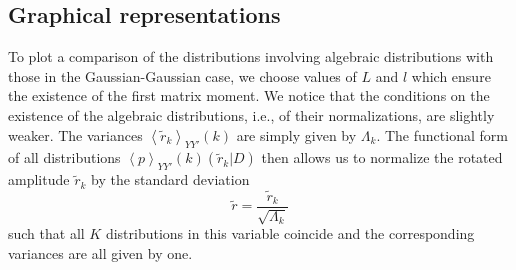 \subsection{Graphical representations}\label{subsec:graphical_distributions}

To plot a comparison of the distributions involving algebraic distributions
with those in the Gaussian-Gaussian case, we choose values of $L$ and $l$ which
ensure the existence of the first matrix moment. We notice that the conditions
on the existence of the algebraic distributions, i.e., of their normalizations,
are slightly weaker. The variances
$\left\langle \tilde{r}_{k} \right\rangle_{YY'}{\left(k\right)}$ are simply
given by $\Lambda_{k}$. The functional form of all distributions
$\left\langle p \right\rangle_{YY'}{\left(k\right)} \left(\tilde{r}_{k} \vert D \right)$
then allows us to normalize the rotated amplitude $\tilde{r}_k$ by the standard
deviation
\begin{equation}
    \tilde{r} = \frac{\tilde{r}_{k}}{\sqrt{\Lambda_{k}}}
\end{equation}
such that all $K$ distributions in this variable coincide and the corresponding
variances are all given by one.